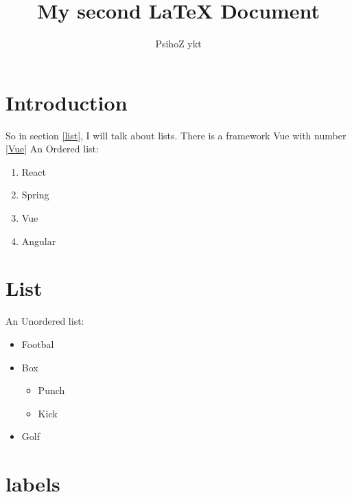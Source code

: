 \documentclass{article}
\author{PsihoZ ykt}
\title{My second {\LaTeX} Document}
\begin{document}
\maketitle

\section{Introduction}

So in section \ref{list}, I will talk about lists.
There is a framework Vue with number \ref{Vue}
An Ordered list:

\begin{enumerate}
\item React
\item Spring
\item Vue\label{Vue}
\item Angular
\end{enumerate}
\section{List\label{list}}
An Unordered list:

\begin{itemize}
\item Footbal
\item Box

\begin{itemize}
\item Punch\label{punch}
\item Kick
\end{itemize}

\item Golf

\end{itemize}

\section{labels}
\end{document}
